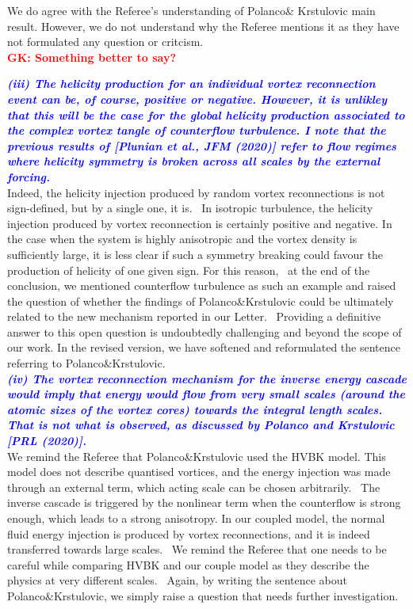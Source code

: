 \documentclass[a4paper,10pt]{article}
\def\red#1{\textcolor{red}{#1}}
\def\blue#1{\textcolor{blue}{#1}}
\def\refcomment#1{\textbf{\blue{\emph{#1}}}\\}
\begin{document}
We do agree with the Referee’s understanding of Polanco\& Krstulovic main result. However, we do not understand why the Referee mentions it as they have not formulated any question or critcism.\\

\red{\textbf{GK: Something better to say?}}

\refcomment{(iii) The helicity production for an individual vortex reconnection event can be, of course, positive or negative. However, it is unlikley that this will be the case for the global helicity production associated to the complex vortex tangle of counterflow turbulence. I note that the previous results of [Plunian et al., JFM (2020)] refer to flow regimes where helicity symmetry is broken across all scales by the external forcing.}

Indeed, the helicity injection produced by random vortex reconnections is not sign-defined, but by a single one, it is.  In isotropic turbulence, the helicity injection produced by vortex reconnection is certainly positive and negative. In the case when the system is highly anisotropic and the vortex density is sufficiently large, it is less clear if such a symmetry breaking could favour the production of helicity of one given sign. For this reason,  at the end of the conclusion, we mentioned counterflow turbulence as such an example and raised the question of whether the findings of Polanco\&Krstulovic could be ultimately related to the new mechanism reported in our Letter.  Providing a definitive answer to this open question is undoubtedly challenging and beyond the scope of our work. In the revised version, we have softened and reformulated the sentence referring to Polanco\&Krstulovic.\\

\refcomment{(iv) The vortex reconnection mechanism for the inverse energy cascade would imply that energy would flow from very small scales (around the atomic sizes of the vortex cores) towards the integral length scales. That is not what is observed, as discussed by Polanco and Krstulovic [PRL (2020)].}

We remind the Referee that Polanco\&Krstulovic used the HVBK model. This model does not describe quantised vortices, and the energy injection was made through an external term, which acting scale can be chosen arbitrarily.  The inverse cascade is triggered by the nonlinear term when the counterflow is strong enough, which leads to a strong anisotropy. In our coupled model, the normal fluid energy injection is produced by vortex reconnections, and it is indeed transferred towards large scales.  We remind the Referee that one needs to be careful while comparing HVBK and our couple model as they describe the physics at very different scales.  Again, by writing the sentence about Polanco\&Krstulovic, we simply raise a question that needs further investigation.\\
\end{document}
